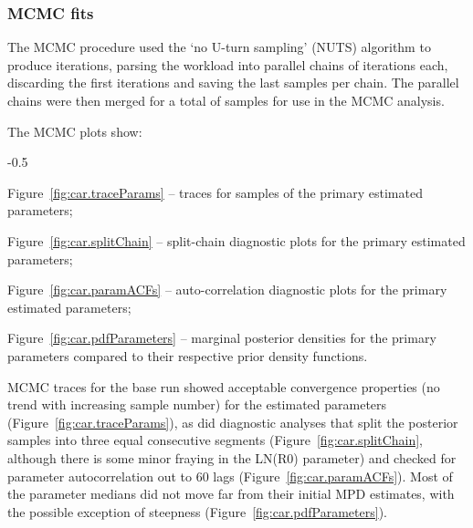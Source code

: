 \documentclass[11pt]{book}
\begin{document}

\graphicspath{{C:/Users/haighr/Files/GFish/PSARC22/CAR/Data/SS/CAR2022/Run24/MPD.24.01/}}
\clearpage

\subsubsection{MCMC fits}\label{sssMCMC}


The MCMC procedure used the `no U-turn sampling' (NUTS) algorithm \citep{Monnahan-Kristensen:2018, Monnahan-etal:2019} to produce \nSims{} iterations, parsing the workload into \nChains{} parallel chains \citep{R:2015_snowfall} of \cSims{} iterations each, discarding the first \cBurn{} iterations and saving the last \cSamps{} samples per chain.
The parallel chains were then merged for a total of \Nmcmc{} samples for use in the MCMC analysis.

The MCMC plots show:
\begin{itemize_csas}{-0.5}{}
\item Figure~\ref{fig:car.traceParams} -- traces for \Nmcmc{} samples of the primary estimated parameters;
\item Figure~\ref{fig:car.splitChain} -- split-chain diagnostic plots for the primary estimated parameters;
\item Figure~\ref{fig:car.paramACFs} -- auto-correlation diagnostic plots for the primary estimated parameters;
\item Figure~\ref{fig:car.pdfParameters} -- marginal posterior densities for the primary parameters compared to their respective prior density functions.
\end{itemize_csas}

MCMC traces for the base run showed acceptable convergence properties (no trend with increasing sample number) for the estimated parameters (Figure~\ref{fig:car.traceParams}), as did diagnostic analyses that split the posterior samples into three equal consecutive segments (Figure~\ref{fig:car.splitChain}, although there is some minor fraying in the LN(R0) parameter) and checked for parameter autocorrelation out to 60 lags (Figure~\ref{fig:car.paramACFs}).
Most of the parameter medians did not move far from their initial MPD estimates, with the possible exception of steepness (Figure~\ref{fig:car.pdfParameters}).
\end{document}
